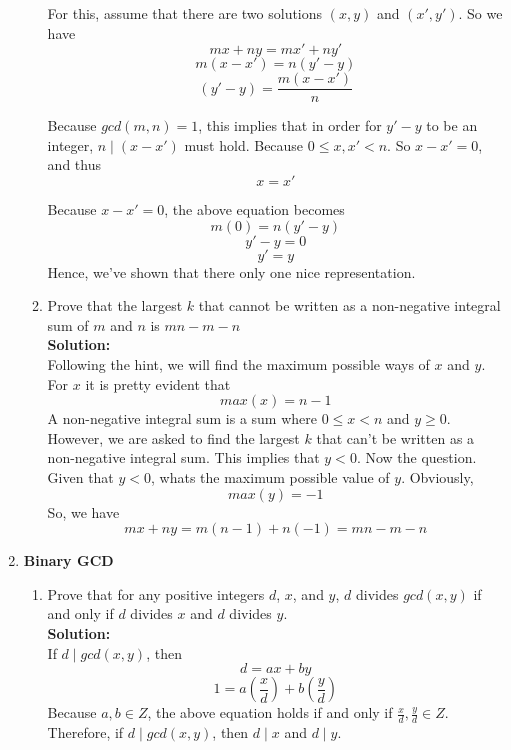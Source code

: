 \documentclass[11pt]{article}
\newcommand{\cmark}{\ding{51}}%
\begin{document}
\begin{enumerate}
\begin{enumerate}
				For this, assume that there are two solutions $(x, y)$ and $(x', y')$. So we have 
							$$mx + ny = mx' + ny'$$
							$$m(x - x') = n(y' - y)$$
							$$(y' - y) = \frac{m(x - x')}{n}$$
							
				Because $gcd(m, n) = 1$, this implies that in order for $y' - y$ to be an integer, $n \mid (x - x')$ must hold. Because $0 \le x, x' < n$. So $x - x' = 0$, and thus
								$$x = x'$$
				
				Because $x - x' = 0$, the above equation becomes 
							$$m(0) = n(y' - y)$$
							$$y' - y = 0$$
							$$y' = y$$
				Hence, we've shown that there only one nice representation. 
				
				\item Prove that the largest $k$ that cannot be written as a non-negative integral sum of $m$ and $n$ is $mn - m - n$ \\
				\textbf{Solution: } \\ Following the hint, we will find the maximum possible ways of $x$ and $y$. For $x$ it is pretty evident that
							$$max(x) = n - 1$$
				A non-negative integral sum is a sum where $0 \le x < n$ and $y \ge 0$. However, we are asked to find the largest $k$ that can't be written as a non-negative integral sum. This implies that $y < 0$. Now the question. Given that $y < 0$, whats the maximum possible value of $y$. Obviously,
						$$max(y) = -1$$
				So, we have   
				$$mx + ny = m(n - 1) + n(-1) = mn - m - n$$
				
			\end{enumerate}
		
		\item \textbf{Binary GCD} 
			\begin{enumerate}
				\item Prove that for any positive integers $d$, $x$, and $y$, $d$ divides $gcd(x,y)$ if and only if $d$ divides $x$ and $d$ divides $y$. \\
				\textbf{Solution: } \\ If $d \mid gcd(x, y)$, then
							$$d = ax + by$$
						$$1 = a (\frac{x}{d}) + b (\frac{y}{d})$$
				Because $a, b \in Z$, the above equation holds if and only if $\frac{x}{d}, \frac{y}{d} \in Z$. Therefore, if $d \mid gcd(x, y)$, then $d \mid x$ and $d \mid y$. \cmark
				

\end{enumerate}
\end{enumerate}
\end{document}
